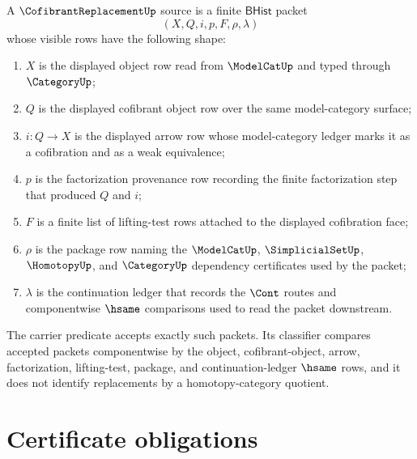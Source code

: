\begin{definition}
\label{def:cofibrantreplacement-bhist-source}
A $\CofibrantReplacementUp$ source is a finite $\mathsf{BHist}$ packet
$$
(X,Q,i,p,F,\rho,\lambda)
$$
whose visible rows have the following shape:
\begin{enumerate}
\item $X$ is the displayed object row read from $\ModelCatUp$ and typed through $\CategoryUp$;
\item $Q$ is the displayed cofibrant object row over the same model-category surface;
\item $i:Q\to X$ is the displayed arrow row whose model-category ledger marks it as a cofibration and as a weak equivalence;
\item $p$ is the factorization provenance row recording the finite factorization step that produced $Q$ and $i$;
\item $F$ is a finite list of lifting-test rows attached to the displayed cofibration face;
\item $\rho$ is the package row naming the $\ModelCatUp$, $\SimplicialSetUp$, $\HomotopyUp$, and $\CategoryUp$ dependency certificates used by the packet;
\item $\lambda$ is the continuation ledger that records the $\Cont$ routes and componentwise $\hsame$ comparisons used to read the packet downstream.
\end{enumerate}
The carrier predicate accepts exactly such packets. Its classifier compares accepted packets componentwise by the object, cofibrant-object, arrow, factorization, lifting-test, package, and continuation-ledger $\hsame$ rows, and it does not identify replacements by a homotopy-category quotient.
\end{definition}

\section{Certificate obligations}
\label{sec:cofibrantreplacement-certificate-obligations}

